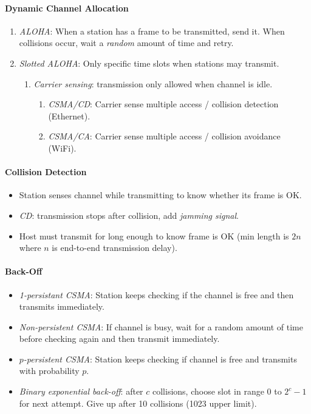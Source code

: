 \documentclass[twocolumn,english]{article}
\begin{document}
\paragraph{Dynamic Channel Allocation}
\begin{enumerate}
\item \emph{ALOHA}: When a station has a frame to be transmitted, send it.
When collisions occur, wait a \emph{random} amount of time and retry.
\item \emph{Slotted ALOHA}: Only specific time slots when stations may transmit.
\begin{enumerate}
\item \emph{Carrier sensing}: transmission only allowed when channel is
idle.
\begin{enumerate}
\item \emph{CSMA/CD}: Carrier sense multiple access / collision detection
(Ethernet).
\item \emph{CSMA/CA}: Carrier sense multiple access / collision avoidance
(WiFi).
\end{enumerate}
\end{enumerate}
\end{enumerate}

\paragraph{Collision Detection}
\begin{itemize}
\item Station senses channel while transmitting to know whether its frame
is OK.
\item \emph{CD}: transmission stops after collision, add \emph{jamming signal}.
\item Host must transmit for long enough to know frame is OK (min length
is $2n$ where $n$ is end-to-end transmission delay).
\end{itemize}

\paragraph{Back-Off}
\begin{itemize}
\item \emph{1-persistant CSMA}: Station keeps checking if the channel is
free and then transmits immediately.
\item \emph{Non-persistent CSMA}: If channel is busy, wait for a random
amount of time before checking again and then transmit immediately.
\item \emph{$p$-persistent CSMA}: Station keeps checking if channel is
free and transmits with probability $p$.
\item \emph{Binary exponential back-off}: after $c$ collisions, choose
slot in range $0$ to $2^{c}-1$ for next attempt. Give up after 10
collisions (1023 upper limit).
\end{itemize}
\end{document}
